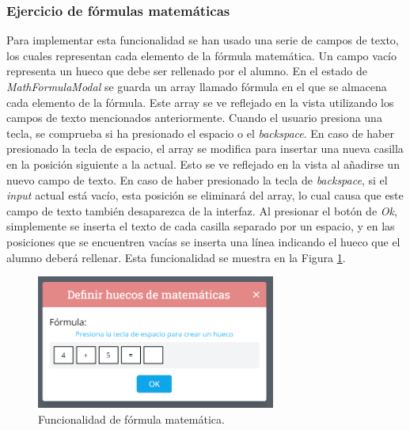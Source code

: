 \subsubsection{Ejercicio de fórmulas matemáticas}
\label{sec:impmatematica}
Para implementar esta funcionalidad se han usado una serie de campos de texto, los cuales representan cada elemento de la fórmula matemática. Un campo vacío representa un hueco que debe ser rellenado por el alumno. En el estado de \textit{MathFormulaModal} se guarda un array llamado fórmula en el que se almacena cada elemento de la fórmula. Este array se ve reflejado en la vista utilizando los campos de texto mencionados anteriormente. Cuando el usuario presiona una tecla, se comprueba si ha presionado el espacio o el \textit{backspace}. En caso de haber presionado la tecla de espacio, el array se modifica para insertar una nueva casilla en la posición siguiente a la actual. Esto se ve reflejado en la vista al añadirse un nuevo campo de texto. En caso de haber presionado la tecla de \textit{backspace}, si el \textit{input} actual está vacío, esta posición se eliminará del array, lo cual causa que este campo de texto también desaparezca de la interfaz. Al presionar el botón de \textit{Ok}, simplemente se inserta el texto de cada casilla separado por un espacio, y en las posiciones que se encuentren vacías se inserta una línea indicando el hueco que el alumno deberá rellenar. Esta funcionalidad se muestra en la Figura \ref{fig:funcionalidadFormulaMatematica}.

\begin{figure}[ht!]
  \centering
  \includegraphics[width=0.7\textwidth]{Imagenes/Funcionalidades/MathFormulaModal.PNG}
  \caption{Funcionalidad de fórmula matemática.}
  \label{fig:funcionalidadFormulaMatematica}
\end{figure}

